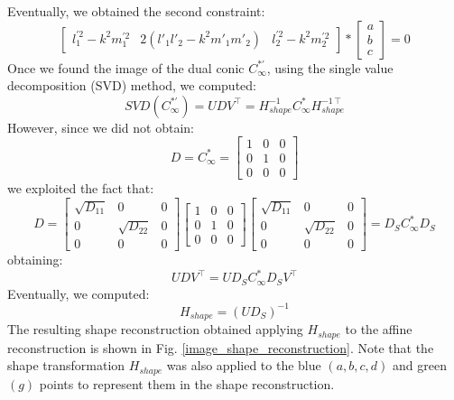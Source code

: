 \documentclass[11pt, oneside]{article}
\begin{document}
Eventually, we obtained the second constraint:
\begin{equation}
	\begin{bmatrix}
		l_1^{'2} - k^2 m_1^{'2} & 2 (l'_1 l'_2 - k^2 m'_1 m'_2) & l_2^{'2} - k^2 m_2^{'2}
	\end{bmatrix}
	*
	\begin{bmatrix}
		a \\ b \\ c
	\end{bmatrix}
	= 0
\end{equation}
Once we found the image of the dual conic $C^{*'}_\infty$, using the single value decomposition (SVD) method, we computed:
$$SVD(C^{*'}_\infty) = U D V^\intercal = H_{shape}^{-1} C^*_\infty H_{shape}^{-1\intercal}$$
However, since we did not obtain:
\begin{equation}
	D = C^*_\infty =
	\begin{bmatrix}
		1 & 0 & 0 \\ 0 & 1 & 0 \\ 0 & 0 & 0
	\end{bmatrix}
\end{equation}
we exploited the fact that:
\begin{equation}
	D =
	\begin{bmatrix}
		\sqrt{D_{11}} & 0 & 0 \\ 0 & \sqrt{D_{22}} & 0 \\ 0 & 0 & 0
	\end{bmatrix}
	\begin{bmatrix}
		1 & 0 & 0 \\ 0 & 1 & 0 \\ 0 & 0 & 0
	\end{bmatrix}
	\begin{bmatrix}
		\sqrt{D_{11}} & 0 & 0 \\ 0 & \sqrt{D_{22}} & 0 \\ 0 & 0 & 0
	\end{bmatrix}
	= D_S C^*_\infty D_S
\end{equation}
obtaining:
\begin{equation}
	U D V^\intercal = U D_S C^*_\infty D_S V^\intercal
\end{equation}
Eventually, we computed:
$$H_{shape} = (U D_S)^{-1}$$
The resulting shape reconstruction obtained applying $H_{shape}$ to the affine reconstruction is shown in Fig. \ref{image_shape_reconstruction}. Note that the shape transformation $H_{shape}$ was also applied to the blue $(a, b, c, d)$ and green $(g)$ points to represent them in the shape reconstruction.
\end{document}
